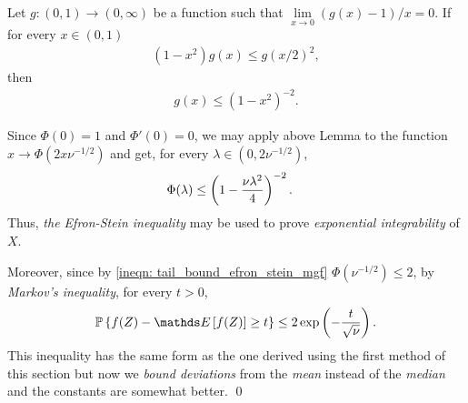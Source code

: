 \documentclass[11pt]{article}
\begin{document}
\begin{itemize}
\begin{remark}
\begin{lemma}
Let $g : (0, 1) \to (0, \infty)$ be a function such that $\lim\limits_{x\to 0}(g(x) - 1) /x = 0$. If for every $x \in (0, 1)$
\begin{align*}
(1- x^2)g(x) \le g(x/2)^2,
\end{align*} then
\begin{align*}
g(x) \le (1- x^2)^{-2}.
\end{align*}
\end{lemma}

Since $\Phi(0) = 1$ and $\Phi'(0) = 0$, we may apply above Lemma to the function $x \to \Phi(2 x \nu^{-1/2})$ and get, for every $\lambda \in (0, 2 \nu^{-1/2})$,
\begin{align}
\Phi(\lambda) &\le \left(1-\frac{\nu \lambda^2}{4}\right)^{-2}. \label{ineqn: tail_bound_efron_stein_mgf}
\end{align} Thus, \emph{the Efron-Stein inequality} may be used to prove \emph{exponential integrability} of $X$.

Moreover, since by \eqref{ineqn: tail_bound_efron_stein_mgf} $\Phi( \nu^{-1/2}) \le 2$, by \emph{Markov's inequality}, for every $t > 0$,
\begin{align}
\bP\set{f(Z) - \E{}{f(Z)} \ge t} \le 2\exp\paren{-\frac{t}{\sqrt{\nu}}}. \label{ineqn: tail_bound_efron_stein_2}
\end{align} This inequality has the same form as the one derived using the first method of this section but now we \emph{bound deviations} from the \emph{mean} instead of the \emph{median} and the constants are somewhat better. \qed
\end{remark}
\end{itemize}


\newpage


\end{document}
